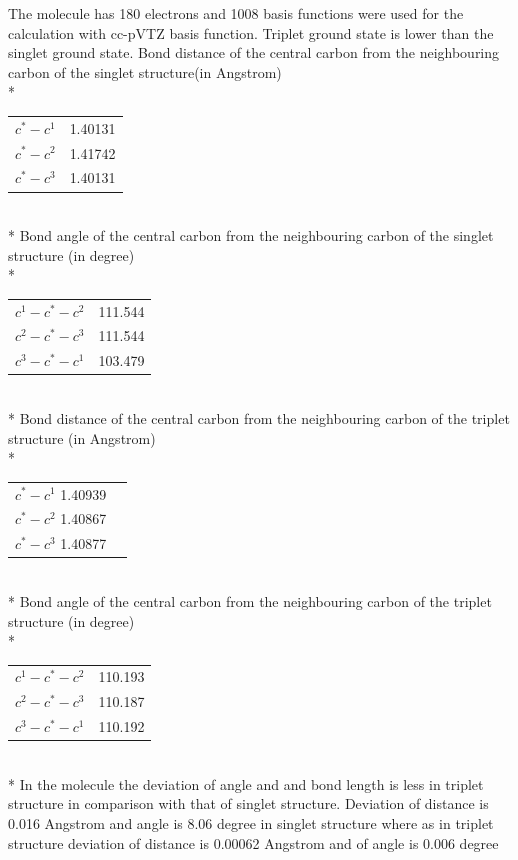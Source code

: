 \documentclass{article}
\begin{document}
The molecule has 180 electrons and 1008 basis functions were used for the calculation with cc-pVTZ basis function. 
Triplet ground state is lower than the singlet ground state.
Bond distance of the central carbon from the neighbouring carbon of the singlet structure(in Angstrom)\\*
\begin{tabular}{c c}
\(c^{*}-c^{1}\) & 1.40131 \\
\(c^{*}-c^{2}\) & 1.41742 \\
\(c^{*}-c^{3}\) & 1.40131\\
\end{tabular}\\*
Bond angle of the central carbon from the neighbouring carbon of the singlet structure (in degree)\\*
\begin{tabular}{c c}
\(c^{1}-c^{*}-c^{2}\) & 111.544\\
\(c^{2}-c^{*}-c^{3}\) & 111.544\\
\(c^{3}-c^{*}-c^{1}\) & 103.479\\
\end{tabular}\\*
Bond distance of the central carbon from the neighbouring carbon of the triplet structure (in Angstrom)\\*
\begin{tabular}{c c}
\(c^{*}-c^{1}\) 1.40939 \\
\(c^{*}-c^{2}\) 1.40867 \\
\(c^{*}-c^{3}\) 1.40877 \\
\end{tabular}\\*
Bond angle of the central carbon from the neighbouring carbon of the triplet structure (in degree)\\*
\begin{tabular}{c c}
\(c^{1}-c^{*}-c^{2}\) & 110.193 \\
\(c^{2}-c^{*}-c^{3}\) & 110.187 \\
\(c^{3}-c^{*}-c^{1}\) & 110.192 \\
\end{tabular}\\*
In the molecule the deviation of angle and and bond length is less in triplet structure in comparison with that of singlet structure.
Deviation of distance is 0.016 Angstrom and angle is 8.06 degree in singlet structure where as in triplet structure deviation of distance is 0.00062 Angstrom and of angle is 0.006 degree

\pagebreak
\end{document}

